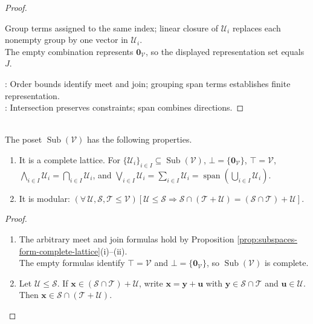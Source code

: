 \begin{proposition}
\begin{proof}
\begin{enumerate}[label=(\roman*)]
Group terms assigned to the same index; linear closure of $\mathcal{U}_i$ replaces each nonempty group by one vector in $\mathcal{U}_i$.\\
The empty combination represents $\mathbf{0}_{\mathcal{V}}$, so the displayed representation set equals $J$.
\end{enumerate}
: Order bounds identify meet and join; grouping span terms establishes finite representation.\\
: Intersection preserves constraints; span combines directions.
\end{proof}
\end{proposition}

\begin{theorem} \label{thm:subspace-lattice-complete-modular} \\
The poset $\operatorname{Sub}(\mathcal{V})$ has the following properties.
\begin{enumerate}[label=(\roman*)]
\setlength{\itemsep}{0pt}
\item It is a complete lattice. For $\{\mathcal{U}_i\}_{i\in I}\subseteq\operatorname{Sub}(\mathcal{V})$, $\bot=\{\mathbf{0}_{\mathcal{V}}\}$, $\top=\mathcal{V}$, $\bigwedge\limits_{i\in I}\mathcal{U}_i=\bigcap\limits_{i\in I}\mathcal{U}_i$, and $\bigvee\limits_{i\in I}\mathcal{U}_i=\sum\limits_{i\in I}\mathcal{U}_i=\operatorname{span}(\bigcup\limits_{i\in I}\mathcal{U}_i)$.
\item It is modular: $(\forall\,\mathcal{U},\mathcal{S},\mathcal{T}\leq\mathcal{V})[\mathcal{U}\leq\mathcal{S}\Rightarrow\mathcal{S}\cap(\mathcal{T}+\mathcal{U})=(\mathcal{S}\cap\mathcal{T})+\mathcal{U}]$.
\end{enumerate}
\begin{proof}
\begin{enumerate}[label=(\roman*)]
\setlength{\itemsep}{0pt}
\item The arbitrary meet and join formulas hold by Proposition \ref{prop:subspaces-form-complete-lattice}(i)--(ii).\\
The empty formulas identify $\top=\mathcal{V}$ and $\bot=\{\mathbf{0}_{\mathcal{V}}\}$, so $\operatorname{Sub}(\mathcal{V})$ is complete.
\item Let $\mathcal{U}\leq\mathcal{S}$. If $\mathbf{x}\in(\mathcal{S}\cap\mathcal{T})+\mathcal{U}$, write $\mathbf{x}=\mathbf{y}+\mathbf{u}$ with $\mathbf{y}\in\mathcal{S}\cap\mathcal{T}$ and $\mathbf{u}\in\mathcal{U}$. Then $\mathbf{x}\in\mathcal{S}\cap(\mathcal{T}+\mathcal{U})$.\\

\end{enumerate}
\end{proof}
\end{theorem}
